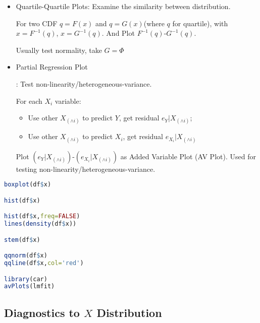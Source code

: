 \begin{itemize}[topsep=2pt,itemsep=2pt]
        \item Quartile-Quartile Plots\hypertarget{QQplot}{}: Examine the similarity  between distribution.
            
        For two CDF $ q=F(x) $ and $ q=G(x) $(where $ q $ for quartile), with $ x=F^{-1}(q) $, $ x=G^{-1}(q) $. And Plot $ F^{-1}(q) $-$ G^{-1}(q) $.

        Usually test normality, take $ G=\Phi  $



        \item \hypertarget{AVPlot}{Partial Regression Plot}: Test non-linearity/heterogeneous-variance.
    
        For each $ X_i $ variable: 
        \begin{itemize}[topsep=2pt,itemsep=0pt]
            \item Use other $ X_{(\wedge i)} $ to predict $ Y $, get residual $ e_Y|X_{(\wedge i)} $;
            \item Use other $ X_{(\wedge i)} $ to predict $ X_i $, get residual $ e_{X_i}|X_{(\wedge i)} $
        \end{itemize}
        
        Plot $ (e_Y|X_{(\wedge i)}) $-$ (e_{X_i}|X_{(\wedge i)}) $ as Added Variable Plot (AV Plot). Used for testing non-linearity/heterogeneous-variance.
    \end{itemize}

     
\begin{rcode}
\begin{lstlisting}[language=R]
boxplot(df$x)

hist(df$x)

hist(df$x,freq=FALSE)
lines(density(df$x))

stem(df$x)

qqnorm(df$x)
qqline(df$x,col='red')

library(car)
avPlots(lmfit)
\end{lstlisting}

\end{rcode}




    
\subsection{Diagnostics to $ X $ Distribution}\label{SubSecXDiagnostics}


